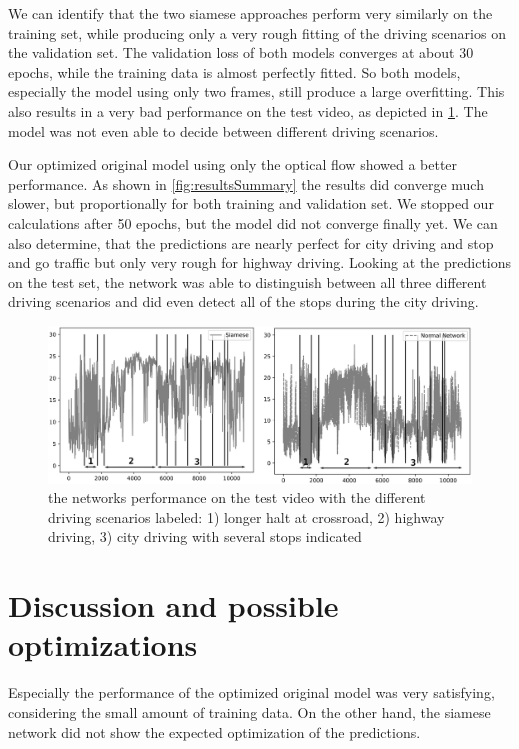\documentclass[conference]{IEEEtran}
\begin{document}
We can identify that the two siamese approaches perform very similarly on the training set, while producing only a very rough fitting of the driving scenarios on the validation set. The validation 
loss of both models converges at about 30 epochs, while the training data is almost perfectly fitted. So both models, especially the model using only two frames, still produce a large overfitting. 
This also results in a very bad performance on the test video, as depicted in \cref{fig:resultsTestvideo}. The model was not even able to decide between different driving scenarios.

Our optimized original model using only the optical flow showed a better performance. As shown in \cref{fig:resultsSummary} the results did converge much slower, but proportionally for both training 
and validation set. We stopped our calculations after 50 epochs, but the model did not converge finally yet. We can also determine, that the predictions are nearly perfect for city driving and stop 
and go traffic but only very rough for highway driving. Looking at the predictions on the test set, the network was able to distinguish between all three different driving scenarios and did even 
detect all of the stops during the city driving.

\begin{figure}[ht]
	\centering
	\includegraphics[width=0.99\columnwidth]{imgs/both_testvideo.eps}
	\caption{the networks performance on the test video with the different driving scenarios labeled: 1) longer halt at crossroad, 2) highway driving, 3) city driving with several stops indicated}
	\label{fig:resultsTestvideo}
\end{figure}

\section{Discussion and possible optimizations}

Especially the performance of the optimized original model was very satisfying, considering the small amount of training data. On the other hand, the siamese network did not show the expected 
optimization of the predictions.
\end{document}
